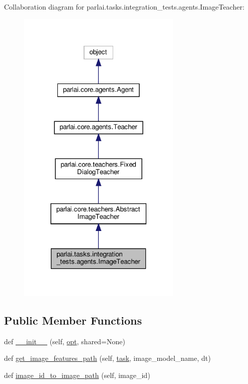 Collaboration diagram for parlai.\+tasks.\+integration\+\_\+tests.\+agents.\+Image\+Teacher\+:\nopagebreak
\begin{figure}[H]
\begin{center}
\leavevmode
\includegraphics[width=222pt]{da/da9/classparlai_1_1tasks_1_1integration__tests_1_1agents_1_1ImageTeacher__coll__graph}
\end{center}
\end{figure}
\subsection*{Public Member Functions}
\begin{DoxyCompactItemize}
\item 
def \hyperlink{classparlai_1_1tasks_1_1integration__tests_1_1agents_1_1ImageTeacher_a3341d0d235586140b1c0c231a21182ff}{\+\_\+\+\_\+init\+\_\+\+\_\+} (self, \hyperlink{classparlai_1_1core_1_1teachers_1_1AbstractImageTeacher_aa7ca0df94cb27a11487e40343cc84de6}{opt}, shared=None)
\item 
def \hyperlink{classparlai_1_1tasks_1_1integration__tests_1_1agents_1_1ImageTeacher_a73c89a1d9f05891ad2a749c81814b93e}{get\+\_\+image\+\_\+features\+\_\+path} (self, \hyperlink{classparlai_1_1core_1_1teachers_1_1AbstractImageTeacher_a78dca77e43183d22d75140ca113d821c}{task}, image\+\_\+model\+\_\+name, dt)
\item 
def \hyperlink{classparlai_1_1tasks_1_1integration__tests_1_1agents_1_1ImageTeacher_a51df7dc7f9a019333479725f3e13653f}{image\+\_\+id\+\_\+to\+\_\+image\+\_\+path} (self, image\+\_\+id)
\end{DoxyCompactItemize}
